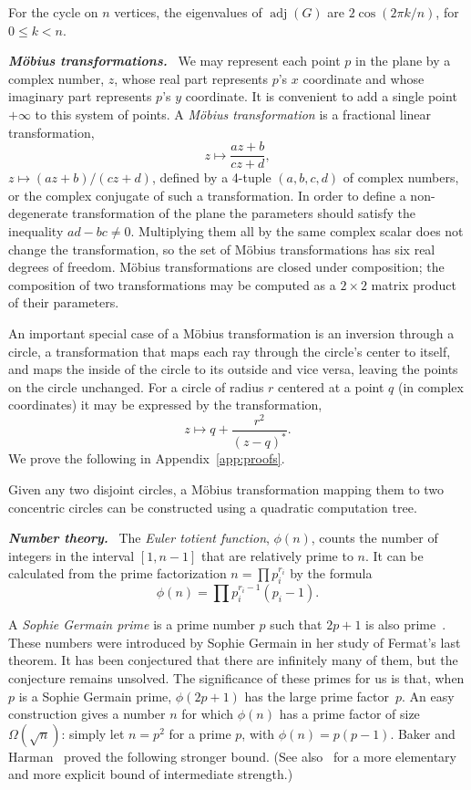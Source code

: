 \documentclass[oribibl,10pt]{llncs}
\newcommand{\Emph}[1]{\smallskip\textbf{\textit{#1}}~}
\DeclareMathOperator{\adjacency}{adj}
\begin{document}
\begin{lemma}\label{lem:cycle-eigenvalues}
For the cycle on $n$ vertices, the eigenvalues of $\adjacency(G)$ are $2\cos(2\pi k/n)$, for $0 \leq k < n$.
\end{lemma}

\Emph{M\"{o}bius transformations.}
We may represent each point $p$ in the plane by a complex number,
$z$,
whose real part represents $p$'s $x$ coordinate and whose 
imaginary part represents $p$'s $y$ coordinate.
\ifFull
It is convenient to add a single point $+\infty$ to this system of points.
\fi
A \emph{M\"obius transformation} is a fractional linear transformation,
\ifFull
\[ z\mapsto \frac{az+b}{cz+d}, \]
\else
$z\mapsto (az+b)/(cz+d)$,
\fi
defined by a 4-tuple $(a,b,c,d)$ of complex numbers, or the complex conjugate of such a transformation.
\ifFull
In order to define a non-degenerate transformation of the plane the parameters should satisfy the inequality $ad-bc\ne 0$. Multiplying them all by the same complex scalar does not change the transformation, so the set of M\"obius transformations has six real degrees of freedom. 
M\"obius transformations are closed under composition; the composition of two transformations may be computed as a $2\times 2$ matrix product of their parameters.

An important special case of a M\"obius transformation is an inversion through a circle, a transformation that maps each ray through the circle's center to itself, and maps the inside of the circle to its outside and vice versa, leaving the points on the circle unchanged.
For a circle of radius $r$ centered at a point $q$ (in complex coordinates)
it may be expressed by the transformation,
\[ z\mapsto q+\frac{r^2}{(z-q)^*}. \]
\fi
We prove the following in Appendix~\ref{app:proofs}.

\begin{lemma}\label{lem:mob-trans}
Given any two disjoint circles, a M\"{o}bius transformation mapping them to two concentric circles can be constructed using a quadratic computation tree.
\end{lemma}

\Emph{Number theory.}
The \emph{Euler totient function}, $\phi(n)$, counts the number of integers in the interval $[1,n-1]$ that are relatively prime to $n$. It can be calculated from the prime factorization $n = \prod p_i^{r_i}$ by the formula \[
\phi(n) = \prod p_i^{r_i-1}(p_i-1).
\]

A \emph{Sophie Germain prime} is a prime number $p$ such that $2p+1$ 
is also prime~\cite{Sho-CINTA-09}. 
\ifFull
These numbers were introduced by Sophie Germain in her study of Fermat's last theorem.
\fi
It has been conjectured that there are infinitely many of them, but the conjecture remains unsolved.
The significance of these primes for us is that, when $p$ is a Sophie Germain prime, $\phi(2p+1)$ has the large prime factor~$p$. 
An easy construction gives a number $n$
for which $\phi(n)$ has a prime factor of size $\Omega(\sqrt n)$: simply let $n=p^2$ for a prime $p$, with $\phi(n)=p(p-1)$. 
Baker and Harman~\cite{BakHar-AA-98} proved the following stronger bound.
\ifFull 
(See also~\cite{Har-MC-05} for a more elementary and more explicit bound of intermediate strength.)
\fi
\end{document}
